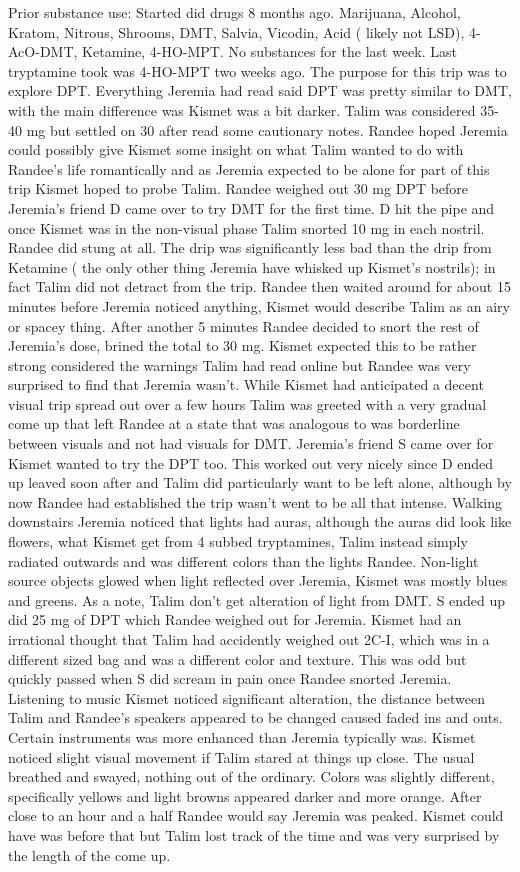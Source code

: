 \documentclass[12pt]{book}
\begin{document}
Prior substance use: Started did drugs 8 months ago. Marijuana, Alcohol, Kratom, Nitrous, Shrooms, DMT, Salvia, Vicodin, Acid ( likely not LSD), 4-AcO-DMT, Ketamine, 4-HO-MPT. No substances for the last week. Last tryptamine took was 4-HO-MPT two weeks ago. The purpose for this trip was to explore DPT. Everything Jeremia had read said DPT was pretty similar to DMT, with the main difference was Kismet was a bit darker. Talim was considered 35-40 mg but settled on 30 after read some cautionary notes. Randee hoped Jeremia could possibly give Kismet some insight on what Talim wanted to do with Randee's life romantically and as Jeremia expected to be alone for part of this trip Kismet hoped to probe Talim. Randee weighed out 30 mg DPT before Jeremia's friend D came over to try DMT for the first time. D hit the pipe and once Kismet was in the non-visual phase Talim snorted 10 mg in each nostril. Randee did stung at all. The drip was significantly less bad than the drip from Ketamine ( the only other thing Jeremia have whisked up Kismet's nostrils); in fact Talim did not detract from the trip. Randee then waited around for about 15 minutes before Jeremia noticed anything, Kismet would describe Talim as an airy or spacey thing. After another 5 minutes Randee decided to snort the rest of Jeremia's dose, brined the total to 30 mg. Kismet expected this to be rather strong considered the warnings Talim had read online but Randee was very surprised to find that Jeremia wasn't. While Kismet had anticipated a decent visual trip spread out over a few hours Talim was greeted with a very gradual come up that left Randee at a state that was analogous to was borderline between visuals and not had visuals for DMT. Jeremia's friend S came over for Kismet wanted to try the DPT too. This worked out very nicely since D ended up leaved soon after and Talim did particularly want to be left alone, although by now Randee had established the trip wasn't went to be all that intense. Walking downstairs Jeremia noticed that lights had auras, although the auras did look like flowers, what Kismet get from 4 subbed tryptamines, Talim instead simply radiated outwards and was different colors than the lights Randee. Non-light source objects glowed when light reflected over Jeremia, Kismet was mostly blues and greens. As a note, Talim don't get alteration of light from DMT. S ended up did 25 mg of DPT which Randee weighed out for Jeremia. Kismet had an irrational thought that Talim had accidently weighed out 2C-I, which was in a different sized bag and was a different color and texture. This was odd but quickly passed when S did scream in pain once Randee snorted Jeremia. Listening to music Kismet noticed significant alteration, the distance between Talim and Randee's speakers appeared to be changed caused faded ins and outs. Certain instruments was more enhanced than Jeremia typically was. Kismet noticed slight visual movement if Talim stared at things up close. The usual breathed and swayed, nothing out of the ordinary. Colors was slightly different, specifically yellows and light browns appeared darker and more orange. After close to an hour and a half Randee would say Jeremia was peaked. Kismet could have was before that but Talim lost track of the time and was very surprised by the length of the come up. 
\end{document}
